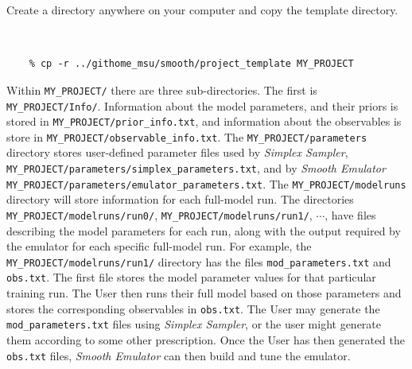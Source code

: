 \documentclass[main.tex]{subfiles}
\begin{document}
Create a directory anywhere on your computer and copy the template directory.
{\tt 
\begin{verbatim}
    % cp -r ../githome_msu/smooth/project_template MY_PROJECT
\end{verbatim}
}
Within {\tt MY\_PROJECT/} there are three sub-directories. The first is {\tt MY\_PROJECT/Info/}. Information about the model parameters, and their priors is stored in {\tt MY\_PROJECT/prior\_info.txt}, and information about the observables is store in {\tt MY\_PROJECT/observable\_info.txt}. The {\tt MY\_PROJECT/parameters} directory stores user-defined parameter files used by {\it Simplex Sampler}, {\tt MY\_PROJECT/parameters/simplex\_parameters.txt}, and by {\it Smooth Emulator} {\tt MY\_PROJECT/parameters/emulator\_parameters.txt}. The {\tt MY\_PROJECT/modelruns} directory will store information for each full-model run. The directories
{\tt  MY\_PROJECT/modelruns/run0/}, {\tt  MY\_PROJECT/modelruns/run1/}, $\cdots$, have files describing the model parameters for each run, along with the output required by the emulator for each specific full-model run. For example, the {\tt  MY\_PROJECT/modelruns/run1/} directory has the files {\tt mod\_parameters.txt} and {\tt obs.txt}. The first file stores the model parameter values for that particular training run. The User then runs their full model based on those parameters and stores the corresponding observables in {\tt obs.txt}. The User may generate the {\tt mod\_parameters.txt} files using {\it Simplex Sampler}, or the user might generate them according to some other prescription. Once the User has then generated the {\tt obs.txt} files, {\it Smooth Emulator} can then build and tune the emulator.
\end{document}
